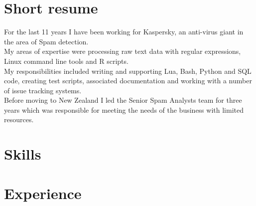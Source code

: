 \documentclass[11pt,a4paper,sans]{moderncv}        %
\begin{document}
\makecvtitle

\section{Short resume}

For the last 11 years I have been working for Kaspersky, an anti-virus giant in the area of Spam detection.
\\My areas of expertise were processing raw text data with regular expressions, Linux command line tools and R scripts.
\\ My responsibilities included writing and supporting Lua, Bash, Python and SQL code, creating test scripts, associated documentation and working with a number of issue tracking systems.
\\ Before moving to New Zealand I led the Senior Spam Analysts team for three years which was responsible for meeting the needs of the business with limited resources.



\section{Skills}



\section{Experience}
\end{document}
